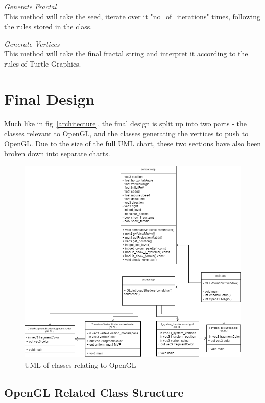 \documentclass[a4paper,10pt]{report}
\begin{document}
\textit{Generate Fractal}\\

This method will take the seed, iterate over it  "no\_of\_iterations" times, following the rules stored in the class.

\textit{Generate Vertices}\\

This method will take the final fractal string and interpret it according to the rules of Turtle Graphics.

\clearpage

\section{Final Design}

Much like in fig~\ref{architecture}, the final design is split up into two parts - the classes relevant to OpenGL, and the classes generating the vertices to push to OpenGL. Due to the size of the full UML chart, these two sections have also been broken down into separate charts.

\begin{figure}[h!]
\centering
  \includegraphics[width=1\textwidth]{OpenGL_UML.png}
 \caption{UML of classes relating to OpenGL}
 \label{fig:opengl_uml}
\end{figure}


\subsection{OpenGL Related Class Structure}
\end{document}
